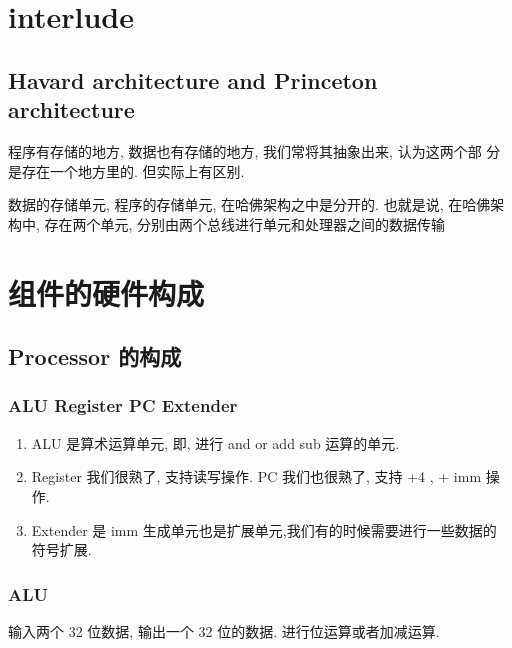 \documentclass[11pt]{ctexart}
\begin{document}
\section{interlude}
\label{sec:orgdc2b27a}
\subsection{Havard architecture and Princeton architecture}
\label{sec:orgcb678b7}
程序有存储的地方, 数据也有存储的地方, 我们常将其抽象出来, 认为这两个部
分是存在一个地方里的. 但实际上有区别. 

数据的存储单元, 程序的存储单元, 在哈佛架构之中是分开的. 
也就是说, 在哈佛架构中, 存在两个单元, 分别由两个总线进行单元和处理器之间的数据传输
\section{组件的硬件构成}
\label{sec:org2ff8b8e}

\subsection{Processor 的构成}
\label{sec:org4730050}
\subsubsection{ALU Register PC Extender}
\label{sec:orgb33b84a}
\begin{enumerate}
\item ALU 是算术运算单元, 即, 进行 and or add sub 运算的单元.
\item Register 我们很熟了, 支持读写操作. PC 我们也很熟了, 支持 +4 , + imm
操作.
\item Extender 是 imm 生成单元也是扩展单元,我们有的时候需要进行一些数据的
符号扩展.
\end{enumerate}
\subsubsection{ALU}
\label{sec:orga1b772e}
输入两个 32 位数据, 输出一个 32 位的数据. 进行位运算或者加减运算. 
\end{document}
